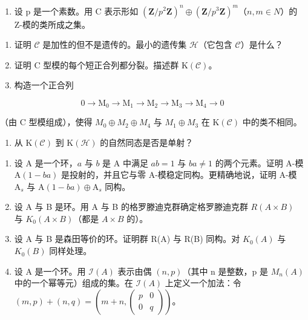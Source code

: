 
\begin{enumerate}
\def\labelenumi{\arabic{enumi})}
\tightlist
\item
  设 p 是一个素数。用 C 表示形如 \((\mathbf{Z}/p^{2}\mathbf{Z})^{n} \oplus (\mathbf{Z}/p^{3}\mathbf{Z})^{m}\)（\(n, m \in N\)）的 Z-模的类所成之集。
\end{enumerate}

\begin{enumerate}
\def\labelenumi{\alph{enumi})}
\item
  证明 \(\mathcal{C}\) 是加性的但不是遗传的。最小的遗传集 \(\mathcal{H}\)（它包含 \(\mathcal{C}\)）是什么？
\item
  证明 C 型模的每个短正合列都分裂。描述群 \(\mathrm{K}(\mathcal{C})\)。
\item
  构造一个正合列
\end{enumerate}

\[
0 \to \mathrm{M} _ {0} \to \mathrm{M} _ {1} \to \mathrm{M} _ {2} \to \mathrm{M} _ {3} \to \mathrm{M} _ {4} \to 0
\]

（由 C 型模组成），使得 \(M_{0} \oplus M_{2} \oplus M_{4}\) 与 \(M_{1} \oplus M_{3}\) 在 \(\mathrm{K}(\mathcal{C})\) 中的类不相同。

\begin{enumerate}
\def\labelenumi{\alph{enumi})}
\setcounter{enumi}{3}
\tightlist
\item
  从 \(\mathrm{K}(\mathcal{C})\) 到 \(\mathrm{K}(\mathcal{H})\) 的自然同态是否是单射？
\end{enumerate}

\begin{enumerate}
\def\labelenumi{\arabic{enumi})}
\setcounter{enumi}{1}
\item
  设 \(\mathrm{A}\) 是一个环，\(a\) 与 \(b\) 是 \(\mathrm{A}\) 中满足 \(ab = 1\) 与 \(ba \neq 1\) 的两个元素。证明 A-模 \(\mathrm{A}(1 - ba)\) 是投射的，并且它与零 A-模稳定同构。更精确地说，证明 A-模 \(\mathrm{A}_s\) 与 \(\mathrm{A}(1 - ba) \oplus \mathrm{A}_s\) 同构。
\item
  设 A 与 B 是环。用 A 与 B 的格罗滕迪克群确定格罗滕迪克群 \(R(A \times B)\) 与 \(K_{0}(A \times B)\)（都是 \(A \times B\) 的）。
\item
  设 A 与 B 是森田等价的环。证明群 R(A) 与 R(B) 同构。对 \(K_{0}(A)\) 与 \(K_{0}(B)\) 同样处理。
\item
  设 A 是一个环。用 \(\mathcal{I}(A)\) 表示由偶 \((n,p)\)（其中 n 是整数，p 是 \(M_{n}(A)\) 中的一个幂等元）组成的集。在 \(\mathcal{I}(A)\) 上定义一个加法：令 \((m,p)+(n,q)=(m+n,\begin{pmatrix} p & 0 \\ 0 & q \end{pmatrix})\)。
\end{enumerate}

